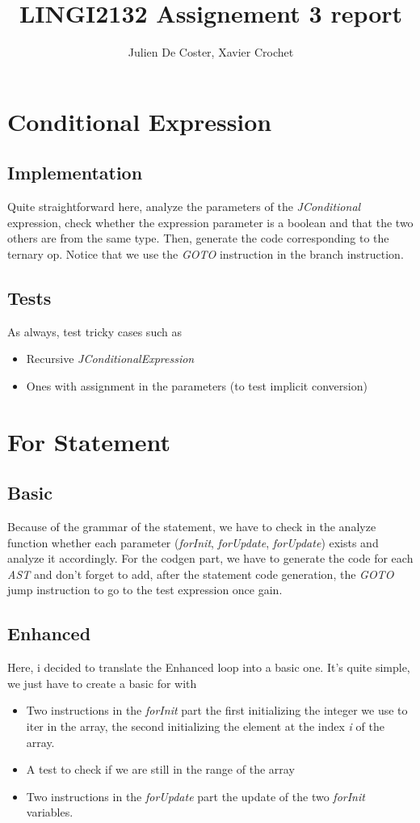 \documentclass[10pt,a4paper]{article}
\author{Julien De Coster, Xavier Crochet}
\title{LINGI2132 Assignement 3 report}
\begin{document}
\maketitle
\section{Conditional Expression}
\subsection{Implementation}
Quite straightforward here, analyze the parameters of the \textit{JConditional} expression, check whether the expression parameter is a boolean and that the two others are from the same type. 
Then, generate the code corresponding to the ternary op. Notice that we use the \textit{GOTO} instruction in the branch instruction.
\subsection{Tests}
As always, test tricky cases such as
\begin{itemize}
\item{Recursive \textit{JConditionalExpression}}
\item{Ones with assignment in the parameters (to test implicit conversion)}
\end{itemize}
\section{For Statement}
\subsection{Basic}
Because of the grammar of the statement, we have to check in the analyze function whether each parameter (\textit{forInit}, \textit{forUpdate}, \textit{forUpdate}) exists and analyze it accordingly. For the codgen part, we have to generate the code for each \textit{AST} and don't forget to add, after the statement code generation,  the \textit{GOTO} jump instruction to go to the test expression once gain. 
\subsection{Enhanced}
Here, i decided to translate the Enhanced loop into a basic one. It's quite simple, we just have to create a basic for with
\begin{itemize}
\item{Two instructions in the \textit{forInit} part\; the first initializing the integer we use to iter in the array, the second initializing the element at the index \textit{i} of the array.}
\item{A test to check if we are still in the range of the array}
\item{Two instructions in the \textit{forUpdate} part\; the update of the two \textit{forInit} variables.}
\end{itemize}
\end{document}
